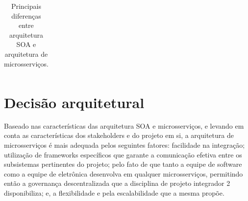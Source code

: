 \begin{table}[H]
\begin{tabular}{|l|l|l|}
	\end{tabular}
\caption{Principais diferenças entre arquitetura SOA e arquitetura de microsserviços.}
\label{diferencas_arquiteturais}
\end{table}

\section{Decisão arquitetural}

Baseado nas características das arquitetura SOA e microsserviços, e levando em conta as características dos stakeholders e do projeto em si,  a arquitetura de microsserviços é mais adequada pelos seguintes fatores: facilidade na integração; utilização de frameworks específicos que garante a comunicação efetiva entre os subsistemas pertinentes do projeto; pelo fato de que tanto a equipe de software como a equipe de eletrônica desenvolva em qualquer microsserviços, permitindo então a governança descentralizada que a disciplina de projeto integrador 2 disponibiliza; e, a flexibilidade e pela escalabilidade que a mesma propõe.
